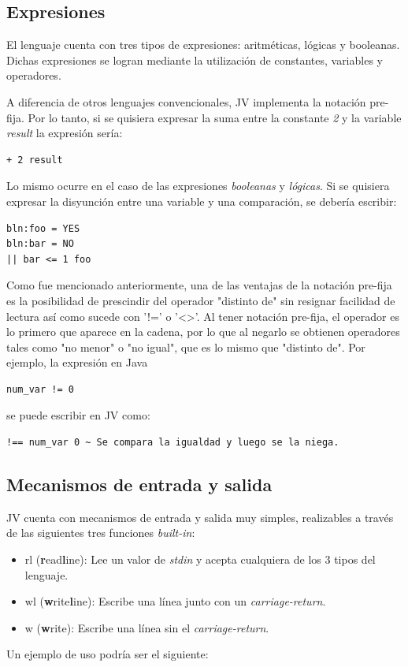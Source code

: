 \documentclass[spanish]{article}
\begin{document}
        \subsection{Expresiones}
            \par El lenguaje cuenta con tres tipos de expresiones: aritméticas, lógicas y booleanas. Dichas expresiones se logran mediante la utilización de constantes, variables y operadores.
            \par A diferencia de otros lenguajes convencionales, JV implementa la notación pre-fija. Por lo tanto, si se quisiera expresar la suma entre la constante \textit{2} y la variable \textit{result} la expresión sería:
            \begin{lstlisting}
+ 2 result
            \end{lstlisting}
            Lo mismo ocurre en el caso de las expresiones \textit{booleanas} y \textit{lógicas}. Si se quisiera expresar la disyunción entre una variable y una comparación, se debería escribir: 
            \begin{lstlisting}
bln:foo = YES
bln:bar = NO
|| bar <= 1 foo
            \end{lstlisting}
            \par Como fue mencionado anteriormente, una de las ventajas de la notación pre-fija es la posibilidad de prescindir del operador "distinto de" sin resignar facilidad de lectura así como sucede con '!=' o '<>'. Al tener notación pre-fija, el operador es lo primero que aparece en la cadena, por lo que al negarlo se obtienen operadores tales como "no menor" o "no igual", que es lo mismo que "distinto de". Por ejemplo, la expresión en Java
            \begin{lstlisting}
num_var != 0
            \end{lstlisting}
            se puede escribir en JV como:
            \begin{lstlisting}
!== num_var 0 ~ Se compara la igualdad y luego se la niega.
            \end{lstlisting}
        \clearpage
        
        \subsection{Mecanismos de entrada y salida}
            \par JV cuenta con mecanismos de entrada y salida muy simples, realizables a través de las siguientes tres funciones \textit{built-in}:
            \begin{itemize}
                \item rl (\textbf{r}ead\textbf{l}ine): Lee un valor de \textit{stdin} y acepta cualquiera de los 3 tipos del lenguaje.
                \item wl (\textbf{w}rite\textbf{l}ine): Escribe una línea junto con un \textit{carriage-return}.
                \item w (\textbf{w}rite): Escribe una línea sin el \textit{carriage-return}.
            \end{itemize}
            \par Un ejemplo de uso podría ser el siguiente:
\end{document}
